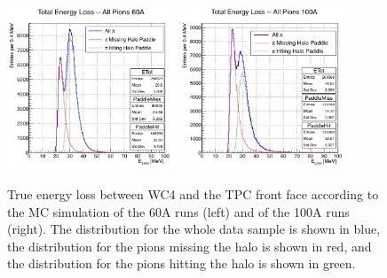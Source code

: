 

\begin{figure}[hbpt]
\centering
\includegraphics[width=0.45\textwidth]{Chapter-9/Images/E_loss60A.png}
\includegraphics[width=0.45\textwidth]{Chapter-9/Images/E_loss100A.png}
\caption{True energy loss between WC4 and the TPC front face according to the MC simulation of the 60A runs (left) and of the 100A runs (right). The distribution for the whole data sample is shown in blue, the distribution for the pions missing the halo is shown in red, and the distribution for the pions hitting the halo is shown in green.  }
\label{fig:ELoss60A}
\end{figure}

